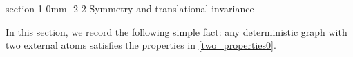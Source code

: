 \documentclass{article}
\makeatletter
\newcommand{\1}{\mathds{1}}
\numberwithin{equation}{section}
\renewcommand{\cal}{\mathcal}
\theoremstyle{plain} %
\theoremstyle{remark}
\renewcommand{\section}{\@startsection
{section}%
{1}%
{0mm}%
{-2\baselineskip}%
{2\baselineskip}%
{\normalfont\large\scshape\centering}} %
\makeatother
\begin{document}





 


\appendix


\section{Symmetry and translational invariance}

In this section, we record the following simple fact: any deterministic graph with two external atoms satisfies the properties in  \eqref{two_properties0}.
\end{document}
